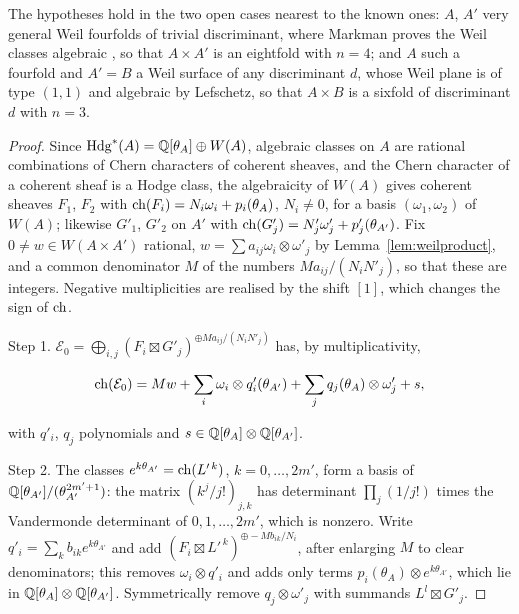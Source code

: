 The hypotheses hold in the two open cases nearest to the known ones: $A$, $A'$ very general Weil fourfolds of trivial discriminant, where Markman proves the Weil classes algebraic \cite{Mar25a,Mar25b}, so that $A\times A'$ is an eightfold with $n=4$; and $A$ such a fourfold and $A'=B$ a Weil surface of any discriminant $d$, whose Weil plane is of type $(1,1)$ and algebraic by Lefschetz, so that $A\times B$ is a sixfold of discriminant $d$ with $n=3$.

\begin{proof}
Since $\mathrm{Hdg}^{*}(A)=\mathbb{Q}[\theta_{A}]\oplus W(A)$, algebraic classes on $A$ are rational combinations of Chern characters of coherent sheaves, and the Chern character of a coherent sheaf is a Hodge class, the algebraicity of $W(A)$ gives coherent sheaves $F_{1}$, $F_{2}$ with $\mathrm{ch}(F_{i})=N_{i}\omega_{i}+p_{i}(\theta_{A})$, $N_{i}\ne0$, for a basis $(\omega_{1},\omega_{2})$ of $W(A)$; likewise $G'_{1}$, $G'_{2}$ on $A'$ with $\mathrm{ch}(G'_{j})=N'_{j}\omega'_{j}+p'_{j}(\theta_{A'})$. Fix $0\ne w\in W(A\times A')$ rational, $w=\sum a_{ij}\omega_{i}\otimes\omega'_{j}$ by Lemma~\ref{lem:weilproduct}, and a common denominator $M$ of the numbers $Ma_{ij}/(N_{i}N'_{j})$, so that these are integers. Negative multiplicities are realised by the shift $[1]$, which changes the sign of $\mathrm{ch}$.

Step 1. $\mathcal{E}_{0}=\bigoplus_{i,j}(F_{i}\boxtimes G'_{j})^{\oplus Ma_{ij}/(N_{i}N'_{j})}$ has, by multiplicativity,
\begin{widetext}
\begin{equation}\label{eq:chE0}
\mathrm{ch}(\mathcal{E}_{0})=Mw+\sum_{i}\omega_{i}\otimes q'_{i}(\theta_{A'})+\sum_{j}q_{j}(\theta_{A})\otimes\omega'_{j}+s,
\end{equation}
\end{widetext}
with $q'_{i}$, $q_{j}$ polynomials and $s\in\mathbb{Q}[\theta_{A}]\otimes\mathbb{Q}[\theta_{A'}]$.

Step 2. The classes $e^{k\theta_{A'}}=\mathrm{ch}(L'^{\,k})$, $k=0,\dots,2m'$, form a basis of $\mathbb{Q}[\theta_{A'}]/(\theta_{A'}^{2m'+1})$: the matrix $(k^{j}/j!)_{j,k}$ has determinant $\prod_{j}(1/j!)$ times the Vandermonde determinant of $0,1,\dots,2m'$, which is nonzero. Write $q'_{i}=\sum_{k}b_{ik}e^{k\theta_{A'}}$ and add $(F_{i}\boxtimes L'^{\,k})^{\oplus-Mb_{ik}/N_{i}}$, after enlarging $M$ to clear denominators; this removes $\omega_{i}\otimes q'_{i}$ and adds only terms $p_{i}(\theta_{A})\otimes e^{k\theta_{A'}}$, which lie in $\mathbb{Q}[\theta_{A}]\otimes\mathbb{Q}[\theta_{A'}]$. Symmetrically remove $q_{j}\otimes\omega'_{j}$ with summands $L^{l}\boxtimes G'_{j}$.


\end{proof}
